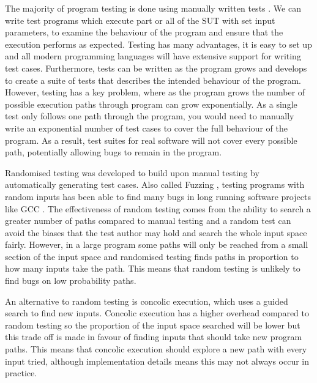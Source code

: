 \documentclass[12pt,twoside]{report}
\begin{document}
The majority of program testing is done using manually written tests \cite{8400261}. We can write test programs which execute part or all of the SUT with set input parameters, to examine the behaviour of the program and ensure that the execution performs as expected. Testing has many advantages, it is easy to set up and all modern programming languages will have extensive support for writing test cases. Furthermore, tests can be written as the program grows and develops to create a suite of tests that describes the intended behaviour of the program. However, testing has a key problem, where as the program grows the number of possible execution paths through program can grow exponentially. As a single test only follows one path through the program, you would need to manually write an exponential number of test cases to cover the full behaviour of the program. As a result, test suites for real software will not cover every possible path, potentially allowing bugs to remain in the program.

Randomised testing was developed to build upon manual testing by automatically generating test cases. Also called Fuzzing \cite{10.1145/96267.96279}, testing programs with random inputs has been able to find many bugs in long running software projects like GCC \cite{csmith, aflwhitepaper}. The effectiveness of random testing comes from the ability to search a greater number of paths compared to manual testing and a random test can avoid the biases that the test author may hold and search the whole input space fairly. However, in a large program some paths will only be reached from a small section of the input space and randomised testing finds paths in proportion to how many inputs take the path. This means that random testing is unlikely to find bugs on low probability paths.

An alternative to random testing is concolic execution, which uses a guided search to find new inputs.
Concolic execution has a higher overhead compared to random testing so the proportion of the input space searched will be lower but this trade off is made in favour of finding inputs that should take new program paths. This means that concolic execution should explore a new path with every input tried, although implementation details means this may not always occur in practice.
\end{document}
